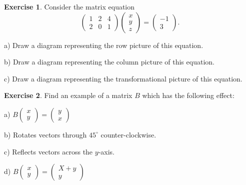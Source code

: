 \documentclass[11pt]{amsart}
\theoremstyle{definition}
\newtheorem{exercise}{Exercise}
\begin{document}
\begin{exercise}
Consider the matrix equation
\[
\begin{pmatrix} 1 & 2 & 4 \\ 2 & 0 & 1 \end{pmatrix} \begin{pmatrix} x \\ y \\ z \end{pmatrix} = \begin{pmatrix} -1 \\ 3 \end{pmatrix} .
\]
\begin{compactitem}
\item[a)] Draw a diagram representing the row picture of this equation.
\item[b)] Draw a diagram representing the column picture of this equation.
\item[c)] Draw a diagram representing the transformational picture of this equation.
\end{compactitem}
\end{exercise}

\begin{exercise}
Find an example of a matrix $B$ which has the following effect:
\begin{compactitem}
\item[a)] $B \left(\begin{smallmatrix} x \\ y \end{smallmatrix}\right) = \left(\begin{smallmatrix} y \\ x \end{smallmatrix}\right)$
\item[b)] Rotates vectors through $45^{\circ}$ counter-clockwise.
\item[c)] Reflects vectors across the $y$-axis.
\item[d)] $B \left(\begin{smallmatrix} x \\ y \end{smallmatrix}\right) = \left(\begin{smallmatrix} X+y \\ y \end{smallmatrix}\right)$
\end{compactitem}
\end{exercise}
\end{document}
